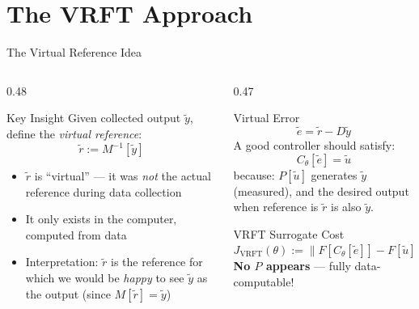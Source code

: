 \documentclass[hyperref={pdfpagemode=FullScreen},aspectratio=169]{beamer}
\newcommand{\highlight}[1]{{\color{accentgreen!70!black}\textbf{#1}}}
\newcommand{\JJ}{J_{\mathrm{VRFT}}}
\begin{document}
\section{The VRFT Approach}

\begin{frame}{The Virtual Reference Idea}
  \begin{columns}[T]
    \begin{column}{0.48\textwidth}
      \begin{block}{Key Insight}
        Given collected output $\tilde{y}$, define the \emph{virtual reference}:
        \[
          \tilde{r} := M^{-1}[\tilde{y}]
        \]
        \begin{itemize}
          \item $\tilde{r}$ is ``virtual'' --- it was \emph{not} the actual reference during data collection
          \item It only exists in the computer, computed from data
          \item Interpretation: $\tilde{r}$ is the reference for which we would be \emph{happy} to see $\tilde{y}$ as the output (since $M[\tilde{r}] = \tilde{y}$)
        \end{itemize}
      \end{block}
    \end{column}
    \begin{column}{0.47\textwidth}
      \begin{exampleblock}{Virtual Error}
        \[
          \tilde{e} = \tilde{r} - D\tilde{y}
        \]
        A good controller should satisfy:
        \[ C_\theta[\tilde{e}] = \tilde{u} \]
        because: $P[\tilde{u}]$ generates $\tilde{y}$ (measured), and the desired output when reference is $\tilde{r}$ is also $\tilde{y}$.
      \end{exampleblock}
      \vspace{-0.4em}
      \begin{block}{VRFT Surrogate Cost}
        \[
          \JJ(\theta) := \bigl\|F[C_\theta[\tilde{e}]] - F[\tilde{u}]\bigr\|^2
        \]
        \highlight{No $P$ appears} --- fully data-computable!
      \end{block}
    \end{column}
  \end{columns}
\end{frame}
\end{document}
